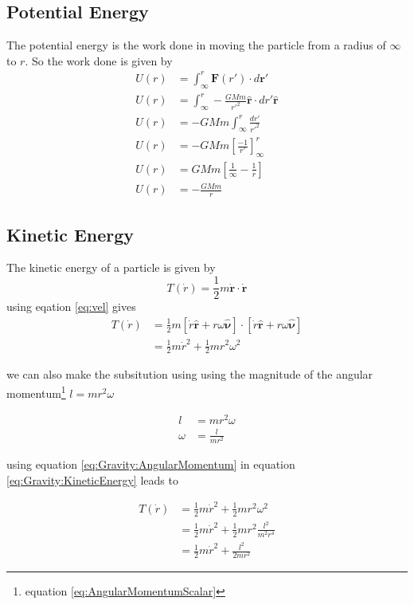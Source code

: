 \subsection{Potential Energy}
The potential energy is the work done in moving the particle from a radius of $\infty$ to $r$.
So the work done is given by
\begin{align}
U(r)&=\int_{\infty}^{r} \mathbf{F}(r') \cdot d\mathbf{r}'  \nonumber \\
U(r)&=\int_{\infty}^{r} -\frac{GMm}{r'^2} \hat{\mathbf{r}} \cdot dr' \hat{\mathbf{r}}  \nonumber \\
U(r)&=-GMm\int_{\infty}^{r} \frac{dr'}{r'^2} \nonumber \\
U(r)&=-GMm \left[ \frac{-1}{r'} \right]_{\infty}^{r} \nonumber \\
U(r)&=GMm \left[ \frac{1}{\infty} - \frac{1}{r} \right] \nonumber \\
U(r)&=- \frac{GMm}{r} \label{eq:potentialEnergy}
\end{align}

\subsection{Kinetic Energy}
The kinetic energy of a particle is given by
\begin{equation}
T(\dot{r})=\frac{1}{2}m\dot{\mathbf{r}}\cdot\dot{\mathbf{r}} \label{eq:KineticEnergy}
\end{equation}
using eqation \ref{eq:vel} gives 
\begin{align}
T(\dot{r})&=\frac{1}{2}m\left[ \dot{r}\hat{\mathbf{r}}+r\omega\hat{\mathbf{\nu}}\right]\cdot\left[ \dot{r}\hat{\mathbf{r}}+r\omega\hat{\mathbf{\nu}}\right] \nonumber \\
&=\frac{1}{2}m \dot{r}^2 + \frac{1}{2}mr^2 \omega^2 \label{eq:Gravity:KineticEnergy}
\end{align}

we can also make the subsitution using using the magnitude of the angular momentum\footnote{equation \ref{eq:AngularMomentumScalar}} $l=mr^2\omega$

\begin{align}
l&=mr^2\omega \nonumber \\
\omega&=\frac{l}{mr^2} \label{eq:Gravity:AngularMomentum}
\end{align}

using equation \ref{eq:Gravity:AngularMomentum} in equation \ref{eq:Gravity:KineticEnergy} leads to

\begin{align}
T(\dot{r})&=\frac{1}{2}m \dot{r}^2 + \frac{1}{2}mr^2 \omega^2 \nonumber \\
&=\frac{1}{2}m \dot{r}^2 + \frac{1}{2}mr^2 \frac{l^2}{m^2r^4} \nonumber \\
&=\frac{1}{2}m \dot{r}^2 + \frac{l^2}{2mr^2} \label{eq:Gravity:KineticEnergyFinal}
\end{align}

